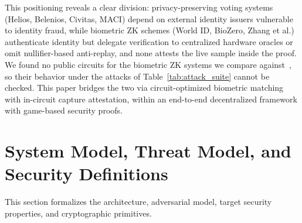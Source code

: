 \documentclass[10pt,letterpaper,journal]{IEEEtran}
\begin{document}
This positioning reveals a clear division: privacy-preserving voting systems (Helios, Belenios, Civitas, MACI) depend on external identity issuers vulnerable to identity fraud, while biometric ZK schemes (World ID, BioZero, Zhang et al.) authenticate identity but delegate verification to centralized hardware oracles or omit nullifier-based anti-replay, and none attests the live sample inside the proof. We found no public circuits for the biometric ZK systems we compare against~\cite{Lai2024,Mao2023,Zhang2025,ZKSeries2025,zkSABER2025}, so their behavior under the attacks of Table~\ref{tab:attack_suite} cannot be checked. This paper bridges the two via circuit-optimized biometric matching with in-circuit capture attestation, within an end-to-end decentralized framework with game-based security proofs.

\section{System Model, Threat Model, and Security Definitions}
\label{sec:system_model}

This section formalizes the architecture, adversarial model, target security properties, and cryptographic primitives.
\end{document}
